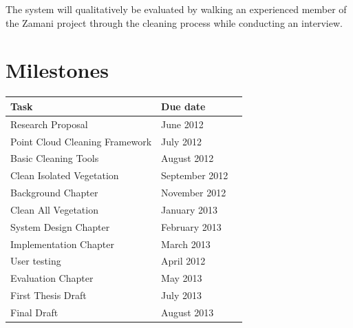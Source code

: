 \documentclass[10pt,twocolumn]{article}
\begin{document}

The system will qualitatively be evaluated by walking an experienced member of the Zamani project through the cleaning process while conducting an interview.
			

\section{Milestones}
\begin{table}[h]
\begin{tabular}{llr}
\hline
Task & Due date \\
\hline
Research Proposal & June 2012\\
Point Cloud Cleaning Framework & July 2012\\
Basic Cleaning Tools & August 2012\\
Clean Isolated Vegetation & September 2012\\
Background Chapter & November 2012\\
Clean All Vegetation & January 2013\\
System Design Chapter & February 2013\\
Implementation Chapter & March 2013\\
User testing & April 2012\\
Evaluation Chapter & May 2013\\
First Thesis Draft & July 2013\\
Final Draft & August 2013\\
\hline
\end{tabular}
\end{table}








\end{document}
